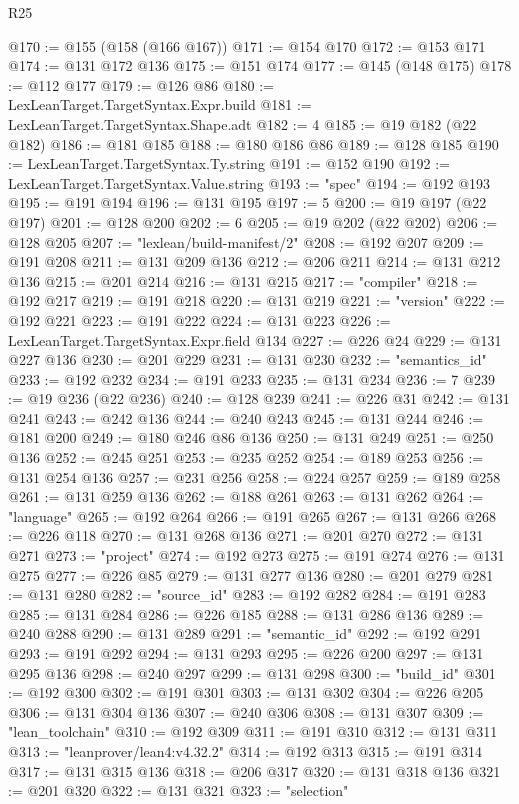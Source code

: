 \begin{lexlean}{R25}
\begin{coremodule}
@170 := @155 (@158 (@166 @167))
@171 := @154 @170
@172 := @153 @171
@174 := @131 @172 @136
@175 := @151 @174
@177 := @145 (@148 @175)
@178 := @112 @177
@179 := @126 @86
@180 := LexLeanTarget.TargetSyntax.Expr.build
@181 := LexLeanTarget.TargetSyntax.Shape.adt
@182 := 4
@185 := @19 @182 (@22 @182)
@186 := @181 @185
@188 := @180 @186 @86
@189 := @128 @185
@190 := LexLeanTarget.TargetSyntax.Ty.string
@191 := @152 @190
@192 := LexLeanTarget.TargetSyntax.Value.string
@193 := "spec"
@194 := @192 @193
@195 := @191 @194
@196 := @131 @195
@197 := 5
@200 := @19 @197 (@22 @197)
@201 := @128 @200
@202 := 6
@205 := @19 @202 (@22 @202)
@206 := @128 @205
@207 := "lexlean/build-manifest/2"
@208 := @192 @207
@209 := @191 @208
@211 := @131 @209 @136
@212 := @206 @211
@214 := @131 @212 @136
@215 := @201 @214
@216 := @131 @215
@217 := "compiler"
@218 := @192 @217
@219 := @191 @218
@220 := @131 @219
@221 := "version"
@222 := @192 @221
@223 := @191 @222
@224 := @131 @223
@226 := LexLeanTarget.TargetSyntax.Expr.field @134
@227 := @226 @24
@229 := @131 @227 @136
@230 := @201 @229
@231 := @131 @230
@232 := "semantics_id"
@233 := @192 @232
@234 := @191 @233
@235 := @131 @234
@236 := 7
@239 := @19 @236 (@22 @236)
@240 := @128 @239
@241 := @226 @31
@242 := @131 @241
@243 := @242 @136
@244 := @240 @243
@245 := @131 @244
@246 := @181 @200
@249 := @180 @246 @86 @136
@250 := @131 @249
@251 := @250 @136
@252 := @245 @251
@253 := @235 @252
@254 := @189 @253
@256 := @131 @254 @136
@257 := @231 @256
@258 := @224 @257
@259 := @189 @258
@261 := @131 @259 @136
@262 := @188 @261
@263 := @131 @262
@264 := "language"
@265 := @192 @264
@266 := @191 @265
@267 := @131 @266
@268 := @226 @118
@270 := @131 @268 @136
@271 := @201 @270
@272 := @131 @271
@273 := "project"
@274 := @192 @273
@275 := @191 @274
@276 := @131 @275
@277 := @226 @85
@279 := @131 @277 @136
@280 := @201 @279
@281 := @131 @280
@282 := "source_id"
@283 := @192 @282
@284 := @191 @283
@285 := @131 @284
@286 := @226 @185
@288 := @131 @286 @136
@289 := @240 @288
@290 := @131 @289
@291 := "semantic_id"
@292 := @192 @291
@293 := @191 @292
@294 := @131 @293
@295 := @226 @200
@297 := @131 @295 @136
@298 := @240 @297
@299 := @131 @298
@300 := "build_id"
@301 := @192 @300
@302 := @191 @301
@303 := @131 @302
@304 := @226 @205
@306 := @131 @304 @136
@307 := @240 @306
@308 := @131 @307
@309 := "lean_toolchain"
@310 := @192 @309
@311 := @191 @310
@312 := @131 @311
@313 := "leanprover/lean4:v4.32.2"
@314 := @192 @313
@315 := @191 @314
@317 := @131 @315 @136
@318 := @206 @317
@320 := @131 @318 @136
@321 := @201 @320
@322 := @131 @321
@323 := "selection"

\end{coremodule}
\end{lexlean}
